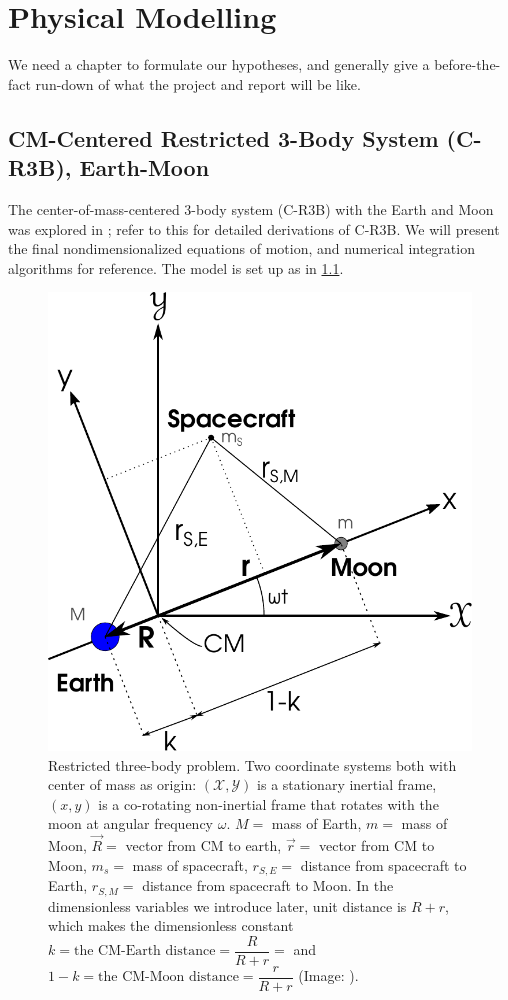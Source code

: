 
\chapter{Physical Modelling}
We need a chapter to formulate our hypotheses, and generally give a before-the-fact run-down of what the project and report will be like.

\section{CM-Centered Restricted 3-Body System (C-R3B), Earth-Moon}
The center-of-mass-centered 3-body system (C-R3B) with the Earth and Moon was explored in \cite{Saxe2015}; refer to this for detailed derivations of C-R3B. We will present the final nondimensionalized equations of motion, and numerical integration algorithms for reference. The model is set up as in \cref{fig:r3b}.

\begin{figure}[ht!]
    \centering
    \includegraphics[scale=0.75]{fig/r3b.pdf}
    \caption{Restricted three-body problem. Two coordinate systems both with center of mass as origin: $(\mathscr{X},\mathscr{Y})$ is a stationary inertial frame, $(x,y)$ is a co-rotating non-inertial frame that rotates with the moon at angular frequency $\omega$. $M =$ mass of Earth, $m =$ mass of Moon, $\vec{R} =$ vector from CM to earth, $\vec{r} =$ vector from CM to Moon, $m_s =$ mass of spacecraft, $r_{S,E} =$ distance from spacecraft to Earth, $r_{S,M} =$ distance from spacecraft to Moon. In the dimensionless variables we introduce later, unit distance is $R+r$, which makes the dimensionless constant $k = \text{the CM-Earth distance} = \dfrac{R}{R+r} = $ and $1-k = \text{the CM-Moon distance} = \dfrac{r}{R+r}$ (Image: \cite{Saxe2015}).}
    \label{fig:r3b}
\end{figure}

